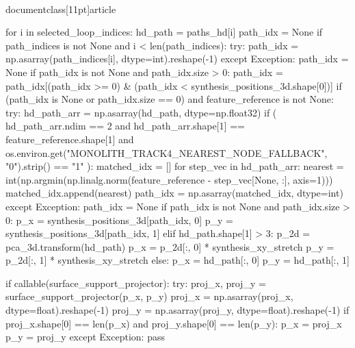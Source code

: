 \\documentclass[11pt]{article}
\begin{document}
\begin{CodeBlock}
{{{{{{                for i in selected_loop_indices:
                    hd_path = paths_hd[i]
                    path_idx = None
                    if path_indices is not None and i < len(path_indices):
                        try:
                            path_idx = np.asarray(path_indices[i], dtype=int).reshape(-1)
                        except Exception:
                            path_idx = None
                    if path_idx is not None and path_idx.size > 0:
                        path_idx = path_idx[(path_idx >= 0) & (path_idx < synthesis_positions_3d.shape[0])]
                    if (path_idx is None or path_idx.size == 0) and feature_reference is not None:
                        try:
                            hd_path_arr = np.asarray(hd_path, dtype=np.float32)
                            if (
                                hd_path_arr.ndim == 2
                                and hd_path_arr.shape[1] == feature_reference.shape[1]
                                and os.environ.get("MONOLITH_TRACK4_NEAREST_NODE_FALLBACK", "0").strip() == "1"
                            ):
                                matched_idx = []
                                for step_vec in hd_path_arr:
                                    nearest = int(np.argmin(np.linalg.norm(feature_reference - step_vec[None, :], axis=1)))
                                    matched_idx.append(nearest)
                                path_idx = np.asarray(matched_idx, dtype=int)
                        except Exception:
                            path_idx = None
                    if path_idx is not None and path_idx.size > 0:
                        p_x = synthesis_positions_3d[path_idx, 0]
                        p_y = synthesis_positions_3d[path_idx, 1]
                    elif hd_path.shape[1] > 3:
                        p_2d = pca_3d.transform(hd_path)
                        p_x = p_2d[:, 0] * synthesis_xy_stretch
                        p_y = p_2d[:, 1] * synthesis_xy_stretch
                    else:
                        p_x = hd_path[:, 0]
                        p_y = hd_path[:, 1]

                    if callable(surface_support_projector):
                        try:
                            proj_x, proj_y = surface_support_projector(p_x, p_y)
                            proj_x = np.asarray(proj_x, dtype=float).reshape(-1)
                            proj_y = np.asarray(proj_y, dtype=float).reshape(-1)
                            if proj_x.shape[0] == len(p_x) and proj_y.shape[0] == len(p_y):
                                p_x = proj_x
                                p_y = proj_y
                        except Exception:
                            pass

}}}}}}
\end{CodeBlock}
\end{document}
